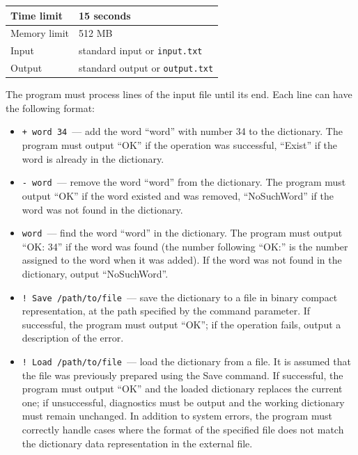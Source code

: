 

\begin{table}[!ht]
\centering
\begin{tabular}{|l|l|}
\hline
Time limit & 15 seconds \\
\hline
Memory limit & 512 MB \\
\hline
Input & standard input or \texttt{input.txt} \\
\hline
Output & standard output or \texttt{output.txt} \\
\hline
\end{tabular}
\end{table}

The program must process lines of the input file until its end. Each line can have the following
format:

\begin{itemize}
    \item \texttt{+ word 34}~--- add the word \enquote{word} with number 34 to the dictionary.
    The program must output \enquote{OK} if the operation was successful, \enquote{Exist} if
    the word is already in the dictionary.
    \item \texttt{- word}~--- remove the word \enquote{word} from the dictionary. The program must
    output \enquote{OK} if the word existed and was removed, \enquote{NoSuchWord} if the word was
    not found in the dictionary.
    \item \texttt{word}~--- find the word \enquote{word} in the dictionary. The program must output
    \enquote{OK: 34} if the word was found (the number following \enquote{OK:} is the number
    assigned to the word when it was added). If the word was not found in the dictionary, output
    \enquote{NoSuchWord}.
    \item \texttt{! Save /path/to/file}~--- save the dictionary to a file in binary compact
    representation, at the path specified by the command parameter. If successful, the program
    must output \enquote{OK}; if the operation fails, output a description of the error.
    \item \texttt{! Load /path/to/file}~--- load the dictionary from a file. It is assumed that
    the file was previously prepared using the Save command. If successful, the program must
    output \enquote{OK} and the loaded dictionary replaces the current one; if unsuccessful,
    diagnostics must be output and the working dictionary must remain unchanged. In addition to
    system errors, the program must correctly handle cases where the format of the specified file
    does not match the dictionary data representation in the external file.
\end{itemize}


